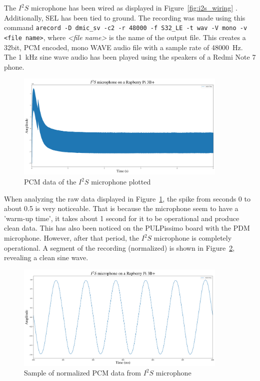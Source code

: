 The $I^2S$ microphone has been wired as displayed in Figure~\ref{fig:i2s_wiring} \cite{i2s_wiring}.
Additionally, SEL has been tied to ground.
The recording was made using this command \lstinline{arecord -D dmic_sv -c2 -r 48000 -f S32_LE -t wav -V mono -v <file name>},
where \emph{<file name>} is the name of the output file.
This creates a 32bit, PCM encoded, mono WAVE audio file with a sample rate of \SI{48000}{\hertz}.
The \SI{1}{\kilo\hertz} sine wave audio has been played using the speakers of a Redmi Note 7 phone.

\begin{figure}[H]
    \centering
    \includegraphics[width=0.9\textwidth]{figures/i2s/i2s_raw_data.png}
    \caption[PCM data of the $I^2S$ microphone plotted]{PCM data of the $I^2S$ microphone plotted}
    \label{fig:i2s_raw}
\end{figure}

When analyzing the raw data displayed in Figure~\ref{fig:i2s_raw}, the spike from seconds 0 to about 0.5
is very noticeable. That is because the microphone seem to have a 'warm-up time', it takes about 1 second for it to be operational and produce clean data.
This has also been noticed on the PULPissimo board with the PDM microphone.
However, after that period, the $I^2S$ microphone is completely operational.
A segment of the recording (normalized) is shown in Figure~\ref{fig:i2s_section}, revealing a clean sine wave.

\begin{figure}[H]
    \centering
    \includegraphics[width=0.9\textwidth]{figures/i2s/i2s_data_recording.png}
    \caption[Sample of normalized PCM data from $I^2S$ microphone]{Sample of normalized PCM data from $I^2S$ microphone}
    \label{fig:i2s_section}
\end{figure}

